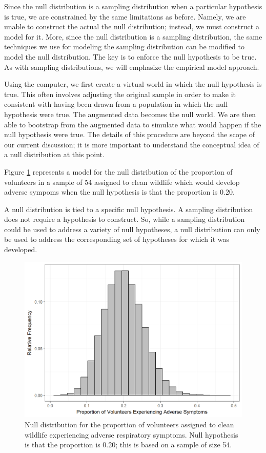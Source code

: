 \documentclass[]{book}
\theoremstyle{plain}
\theoremstyle{mydefn}
\theoremstyle{myexmpl}
\theoremstyle{remark}
\let\BeginKnitrBlock\begin \let\EndKnitrBlock\end
\let\BeginKnitrBlock\begin \let\EndKnitrBlock\end
\begin{document}
Since the null distribution is a sampling distribution when a particular
hypothesis is true, we are constrained by the same limitations as
before. Namely, we are unable to construct the actual the null
distribution; instead, we must construct a model for it. More, since the
null distribution is a sampling distribution, the same techniques we use
for modeling the sampling distribution can be modified to model the null
distribution. The key is to enforce the null hypothesis to be true. As
with sampling distributions, we will emphasize the empirical model
approach.

Using the computer, we first create a virtual world in which the null
hypothesis is true. This often involves adjusting the original sample in
order to make it consistent with having been drawn from a population in
which the null hypothesis were true. The augmented data becomes the null
world. We are then able to bootstrap from the augmented data to simulate
what would happen if the null hypothesis were true. The details of this
procedure are beyond the scope of our current discussion; it is more
important to understand the conceptual idea of a null distribution at
this point.

Figure \ref{fig:nulldistns-deepwater-null} represents a model for the
null distribution of the proportion of volunteers in a sample of 54
assigned to clean wildlife which would develop adverse sympoms when the
null hypothesis is that the proportion is 0.20.

\BeginKnitrBlock{rmdtip}
A null distribution is tied to a specific null hypothesis. A sampling
distribution does not require a hypothesis to construct. So, while a
sampling distribution could be used to address a variety of null
hypotheses, a null distribution can only be used to address the
corresponding set of hypotheses for which it was developed.
\EndKnitrBlock{rmdtip}

\begin{figure}

{\centering \includegraphics[width=0.8\linewidth]{./Images/nulldistns-deepwater-null-1} 

}

\caption{Null distribution for the proportion of volunteers assigned to clean wildlife experiencing adverse respiratory symptoms.  Null hypothesis is that the proportion is 0.20; this is based on a sample of size 54.}\label{fig:nulldistns-deepwater-null}
\end{figure}
\end{document}
